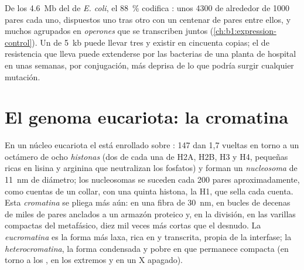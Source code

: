 \begin{example}\label{ex:b1:genomes:dense}
De los \qty{4.6}{Mb} del  de \emph{E. coli}, el \qty{88}{\%}
codifica : unos \num{4300}  de alrededor de \num{1000} pares
cada uno, dispuestos uno tras otro con un centenar de pares entre ellos, y
muchos agrupados en \emph{operones} que se transcriben juntos
(\cref{ch:b1:expression-control}). Un  de \qty{5}{kb} puede llevar
tres  y existir en cincuenta copias; el  de resistencia que lleva
puede extenderse por las bacterias de una planta de hospital en unas
semanas, por conjugación, más deprisa de lo que podría surgir cualquier
mutación.
\end{example}

\section{El genoma eucariota: la cromatina}

\begin{definition}\label{def:b1:genomes:nucleosome}
En un núcleo eucariota el  está enrollado sobre : \qty{147}{}
 dan 1,7 vueltas en torno a un octámero de ocho
\emph{histonas} (dos de cada una de H2A, H2B, H3 y H4,  pequeñas
ricas en lisina y arginina que neutralizan los fosfatos) y forman un
\emph{nucleosoma} de \qty{11}{nm} de diámetro; los
nucleosomas se suceden cada \qty{200}{} pares aproximadamente, como cuentas
de un collar, con una quinta histona, la H1, que sella cada cuenta. Esta
\emph{cromatina} se pliega más aún: en una fibra de \qty{30}{nm}, en bucles
de decenas de miles de pares anclados a un armazón proteico y, en la
división, en las varillas compactas del  metafásico, diez mil veces
más cortas que el  desnudo. La \emph{eucromatina} es la forma más laxa,
rica en  y transcrita, propia de la interfase; la
\emph{heterocromatina}, la forma condensada y pobre en  que permanece
compacta (en torno a los , en los extremos y en un  X
apagado).
\end{definition}

